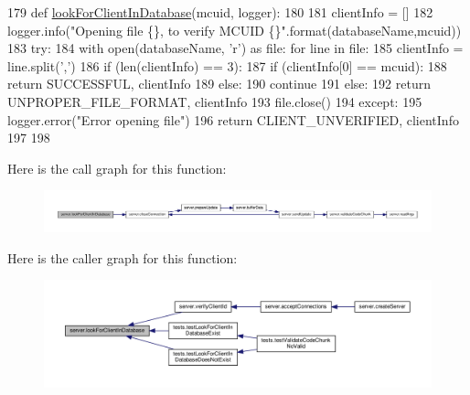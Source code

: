 \begin{DoxyCode}
179 \textcolor{keyword}{def }\hyperlink{namespaceserver_a998e5671e2ab0c79b9abe44e87e203a0}{lookForClientInDatabase}(mcuid, logger):
180      
181      clientInfo = []
182      logger.info(\textcolor{stringliteral}{"Opening file \{\}, to verify MCUID \{\}"}.format(databaseName,mcuid))
183      \textcolor{keywordflow}{try}:
184           with open(databaseName, \textcolor{stringliteral}{'r') as file:               }\textcolor{keywordflow}{for} line \textcolor{keywordflow}{in} file:
185                     clientInfo = line.split(\textcolor{stringliteral}{','})
186                     \textcolor{keywordflow}{if} (len(clientInfo) == 3):
187                          \textcolor{keywordflow}{if} (clientInfo[0] == mcuid):
188                              \textcolor{keywordflow}{return} SUCCESSFUL, clientInfo
189                          \textcolor{keywordflow}{else}:
190                               \textcolor{keywordflow}{continue}
191                     \textcolor{keywordflow}{else}:
192                          \textcolor{keywordflow}{return} UNPROPER\_FILE\_FORMAT, clientInfo
193           file.close()
194      \textcolor{keywordflow}{except}:
195           logger.error(\textcolor{stringliteral}{"Error opening file"})
196      \textcolor{keywordflow}{return} CLIENT\_UNVERIFIED, clientInfo
197 
198 \end{DoxyCode}
Here is the call graph for this function\+:
\nopagebreak
\begin{figure}[H]
\begin{center}
\leavevmode
\includegraphics[width=350pt]{namespaceserver_a998e5671e2ab0c79b9abe44e87e203a0_cgraph}
\end{center}
\end{figure}
Here is the caller graph for this function\+:
\nopagebreak
\begin{figure}[H]
\begin{center}
\leavevmode
\includegraphics[width=350pt]{namespaceserver_a998e5671e2ab0c79b9abe44e87e203a0_icgraph}
\end{center}
\end{figure}
\mbox{\label{namespaceserver_a4ab7e63c5f934dfea50b006468f9efca}} 
